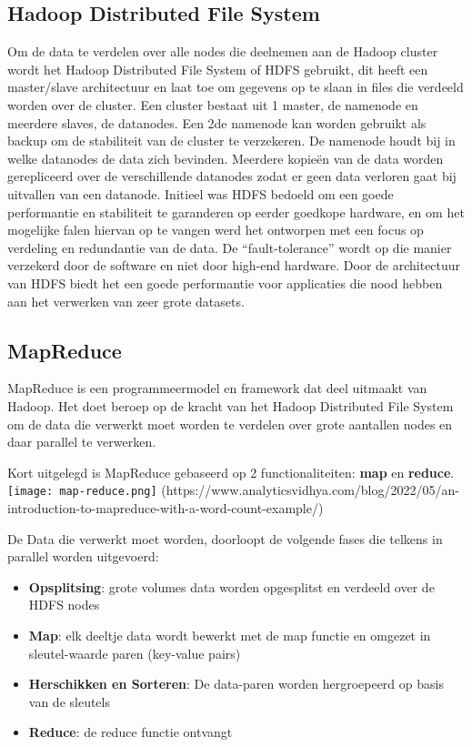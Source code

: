 \subsection{Hadoop Distributed File System}
Om de data te verdelen over alle nodes die deelnemen aan de Hadoop cluster wordt het Hadoop Distributed File System of HDFS gebruikt, dit heeft een master/slave architectuur en laat toe om gegevens op te slaan in files die verdeeld worden over de cluster. Een cluster bestaat uit 1 master, de namenode en meerdere slaves, de datanodes. Een 2de namenode kan worden gebruikt als backup om de stabiliteit van de cluster te verzekeren.
\newline
De namenode houdt bij in welke datanodes de data zich bevinden. Meerdere kopieën van de data worden gerepliceerd over de verschillende datanodes zodat er geen data verloren gaat bij uitvallen van een datanode.
\newline
\newline
Initieel was HDFS bedoeld om een goede performantie en stabiliteit te garanderen op eerder goedkope hardware, en om het mogelijke falen hiervan op te vangen werd het ontworpen met een focus op verdeling en redundantie van de data. De ``fault-tolerance'' wordt op die manier verzekerd door de software en niet door high-end hardware.
Door de architectuur van HDFS biedt het een goede performantie voor applicaties die nood hebben aan het verwerken van zeer grote datasets.\textcite{Borthakur2007a}
\newline
\newline
\subsection{MapReduce}
MapReduce is een programmeermodel en framework dat deel uitmaakt van Hadoop. Het doet beroep op de kracht van het Hadoop Distributed File System om de data die verwerkt moet worden te verdelen over grote aantallen nodes en daar parallel te verwerken.\textcite{Talend2023}

Kort uitgelegd is MapReduce gebaseerd op 2 functionaliteiten: \textbf{map} en \textbf{reduce}.
\newline
\newline
\texttt{[image: map-reduce.png]}
(https://www.analyticsvidhya.com/blog/2022/05/an-introduction-to-mapreduce-with-a-word-count-example/)

\newline
\newline
De Data die verwerkt moet worden, doorloopt de volgende fases die telkens in parallel worden uitgevoerd:
\begin{itemize}
    \item \textbf{Opsplitsing}: grote volumes data worden opgesplitst en verdeeld over de HDFS nodes
    \item \textbf{Map}: elk deeltje data wordt bewerkt met de map functie en omgezet in sleutel-waarde paren (key-value pairs)
    \item \textbf{Herschikken en Sorteren}: De data-paren worden hergroepeerd op basis van de sleutels
    \item \textbf{Reduce}: de reduce functie ontvangt 
\end{itemize}

